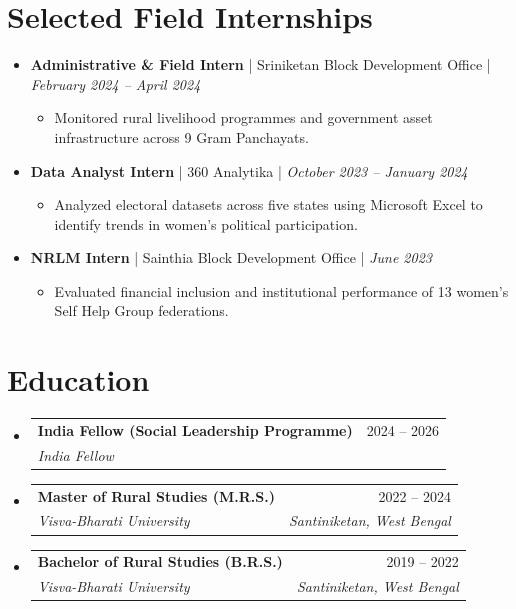 ﻿\documentclass[11pt,a4paper]{article}
\makeatletter
\newcommand{\resumeItem}[1]{\item\small{#1}}
\newcommand{\resumeHeading}[4]{
  \vspace{0.5ex}\item[]
    \begin{tabular*}{1\textwidth}[t]{l@{\extracolsep{\fill}}r}
      \textbf{#1} & #2 \\
      \textit{#3} & \textit{#4} \\
    \end{tabular*}\vspace{-1.5ex}
}
\newcommand{\resumeInternship}[3]{
  \vspace{0.5ex}\item[]
    \textbf{#1} | #2 | \textit{#3}
}
\makeatother
\begin{document}
\section*{Selected Field Internships}
\begin{itemize}[leftmargin=0in, label={}]
  \resumeInternship{Administrative \& Field Intern}{Sriniketan Block Development Office}{February 2024 -- April 2024}
  \begin{itemize}[leftmargin=0.2in, label={--}]
    \resumeItem{Monitored rural livelihood programmes and government asset infrastructure across 9 Gram Panchayats.}
  \end{itemize}
  \resumeInternship{Data Analyst Intern}{360 Analytika}{October 2023 -- January 2024}
  \begin{itemize}[leftmargin=0.2in, label={--}]
    \resumeItem{Analyzed electoral datasets across five states using Microsoft Excel to identify trends in women's political participation.}
  \end{itemize}
  \resumeInternship{NRLM Intern}{Sainthia Block Development Office}{June 2023}
  \begin{itemize}[leftmargin=0.2in, label={--}]
    \resumeItem{Evaluated financial inclusion and institutional performance of 13 women's Self Help Group federations.}
  \end{itemize}
\end{itemize}

\section*{Education}
\begin{itemize}[leftmargin=0in, label={}]
  \resumeHeading
    {India Fellow (Social Leadership Programme)}{2024 -- 2026}
    {India Fellow}{}
  \resumeHeading
    {Master of Rural Studies (M.R.S.)}{2022 -- 2024}
    {Visva-Bharati University}{Santiniketan, West Bengal}
  \resumeHeading
    {Bachelor of Rural Studies (B.R.S.)}{2019 -- 2022}
    {Visva-Bharati University}{Santiniketan, West Bengal}
\end{itemize}

\end{document}
